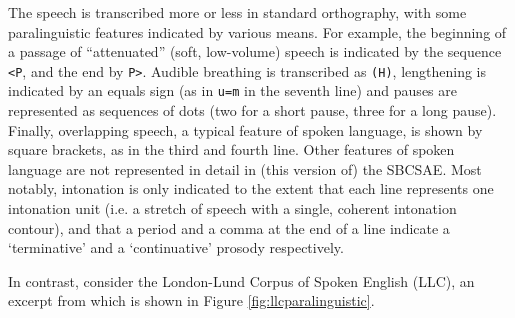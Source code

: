 The speech is transcribed more or less in standard orthography, with some paralinguistic features indicated by various means. For example, the beginning of a passage of ``attenuated'' (soft, low-volume) speech is indicated by the sequence \texttt{<P}, and the end by \texttt{P>}. Audible breathing is transcribed as \texttt{(H)}, lengthening is indicated by an equals sign (as in \texttt{u=m} in the seventh line) and pauses are represented as sequences of dots (two for a short pause, three for a long pause). Finally, overlapping speech, a typical feature of spoken language, is shown by square brackets, as in the third and fourth line. Other features of spoken language are not represented in detail in (this version of) the SBCSAE. Most notably, intonation is only indicated to the extent that each line represents one intonation unit (i.e. a stretch of speech with a single, coherent intonation contour), and that a period and a comma at the end of a line indicate a `terminative' and a `continuative' prosody respectively.

In contrast, consider the London-Lund Corpus of Spoken English (LLC), an excerpt from which is shown in Figure \ref{fig:llcparalinguistic}. 


